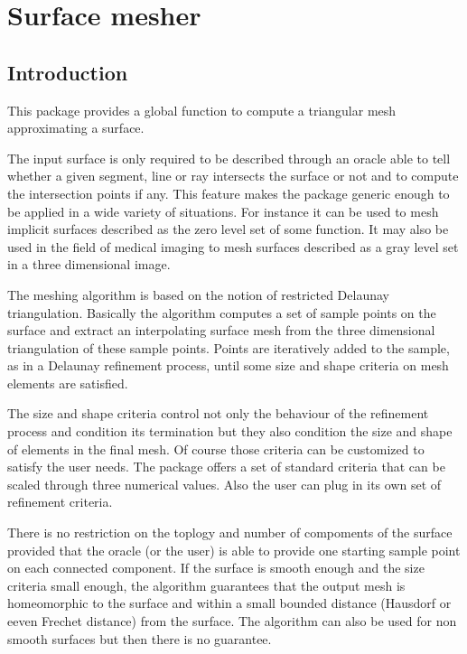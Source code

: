 \chapter{Surface mesher}
\label{chapter_SurfaceMesher}

\vspace*{-15mm}
\minitoc
\vspace*{30mm}

\section{Introduction}
\label{SurfaceMesher_section_intro}

This package provides a global function
to compute a triangular mesh approximating a surface.

The input surface is only required to be described
 through an oracle able to  tell whether a
given segment, line or ray intersects the surface or not
and to compute the intersection points if any.
This feature makes the package generic enough to be
applied in a wide variety of situations. For instance it can be
used to mesh implicit surfaces described as the zero level set
of some function. It may also be used in the field of medical imaging
to mesh surfaces described as a gray
level set in a three dimensional image.


The meshing algorithm is based on the notion of restricted
Delaunay triangulation. Basically the algorithm  computes a set of
sample points on the surface and extract an interpolating 
surface mesh  from the three dimensional triangulation of these 
sample points. Points are iteratively added to the sample,
as in a Delaunay refinement process, until some size and shape
criteria on mesh elements are satisfied. 


The size and shape criteria control not only the  behaviour of
the refinement process and condition its termination
but they also condition  the size and shape of elements in the final
mesh. Of course those criteria can be customized to satisfy
the user needs. The  package offers
a set of standard criteria that can be scaled through
three numerical values. Also the user can plug in its own 
set of refinement criteria.

There is no restriction on the toplogy and number of compoments
of the surface provided that the oracle (or the user)
is able to provide one starting sample point on each connected component.
If the surface is smooth enough and the size criteria
small enough, the algorithm guarantees 
that the output mesh is homeomorphic to the
surface and within a small bounded distance
(Hausdorf or eeven Frechet distance) from the surface.
The algorithm can also be used for non smooth surfaces
but then there is no guarantee. 





